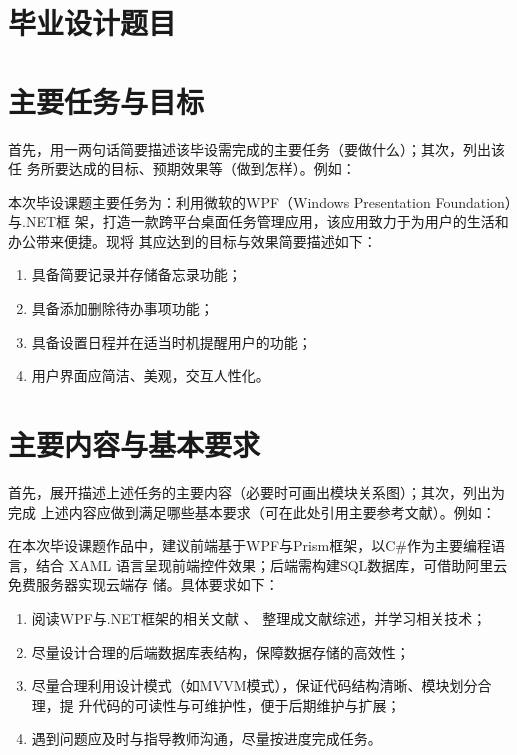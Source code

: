 \section{毕业设计题目}

\makeatletter
\@title %
\makeatother

\section{主要任务与目标}

\begin{tcolorbox}
    首先，用一两句话简要描述该毕设需完成的主要任务（要做什么）；其次，列出该任
    务所要达成的目标、预期效果等（做到怎样）。例如：
\end{tcolorbox}

本次毕设课题主要任务为：利用微软的WPF（Windows Presentation Foundation）与.NET框
架，打造一款跨平台桌面任务管理应用，该应用致力于为用户的生活和办公带来便捷。现将
其应达到的目标与效果简要描述如下：
\begin{enumerate}
    \item 具备简要记录并存储备忘录功能；
    \item 具备添加删除待办事项功能；
    \item 具备设置日程并在适当时机提醒用户的功能；
    \item 用户界面应简洁、美观，交互人性化。
\end{enumerate}

\section{主要内容与基本要求}

\begin{tcolorbox}
    首先，展开描述上述任务的主要内容（必要时可画出模块关系图）；其次，列出为完成
    上述内容应做到满足哪些基本要求（可在此处引用主要参考文献）。例如：
\end{tcolorbox}

在本次毕设课题作品中，建议前端基于WPF与Prism框架，以C\#作为主要编程语言，结合
XAML 语言呈现前端控件效果；后端需构建SQL数据库，可借助阿里云免费服务器实现云端存
储。具体要求如下：
\begin{enumerate}
    \item 阅读WPF与.NET框架的相关文献
          \cite{chen1980zhongguo,chen2005zhulu,chu2004tushu,yuan2012lanc,lamport1986document,niu2013zonghe,Bohan1928,Dubrovin1906,hls2012jinji,wikibook2014latex}、
          整理成文献综述，并学习相关技术；
    \item 尽量设计合理的后端数据库表结构，保障数据存储的高效性；
    \item 尽量合理利用设计模式（如MVVM模式），保证代码结构清晰、模块划分合理，提
          升代码的可读性与可维护性，便于后期维护与扩展；
    \item 遇到问题应及时与指导教师沟通，尽量按进度完成任务。
\end{enumerate}

